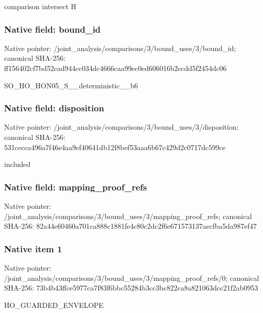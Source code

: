 \documentclass[10pt,a4paper]{article}
\begin{document}
\begingroup\raggedright\sloppy comparison intersect H\par\endgroup

\subsubsection{Native field: bound\_\allowbreak{}id}
Native pointer: /joint\_\allowbreak{}analysis/comparisons/3/bound\_\allowbreak{}uses/3/bound\_\allowbreak{}id; canonical SHA-256: ff156402cf7bd52cad944cc034dc4666caa99ec0ed606016b2ecdd5f2454dc06

\begingroup\raggedright\sloppy SO\_\allowbreak{}HO\_\allowbreak{}HON05\_\allowbreak{}S\_\allowbreak{}\_\allowbreak{}deterministic\_\allowbreak{}\_\allowbreak{}b6\par\endgroup

\subsubsection{Native field: disposition}
Native pointer: /joint\_\allowbreak{}analysis/comparisons/3/bound\_\allowbreak{}uses/3/disposition; canonical SHA-256: 531cecca496a7f46e4aa9ef40641db12f8bef53aaa6b67c429d2c0717dc599ce

\begingroup\raggedright\sloppy included\par\endgroup

\subsubsection{Native field: mapping\_\allowbreak{}proof\_\allowbreak{}refs}
Native pointer: /joint\_\allowbreak{}analysis/comparisons/3/bound\_\allowbreak{}uses/3/mapping\_\allowbreak{}proof\_\allowbreak{}refs; canonical SHA-256: 82a44e60460a701ca888c1881fe4c80c2dc2f6e671573137aecfba5da987ef47

\subsubsection{Native item 1}
Native pointer: /joint\_\allowbreak{}analysis/comparisons/3/bound\_\allowbreak{}uses/3/mapping\_\allowbreak{}proof\_\allowbreak{}refs/0; canonical SHA-256: 73b4b43ffce5977ca7f83f6bbc55284b3cc3bc822ca8a821063dcc21f2ab0953

\begingroup\raggedright\sloppy HO\_\allowbreak{}GUARDED\_\allowbreak{}ENVELOPE\par\endgroup
\end{document}
